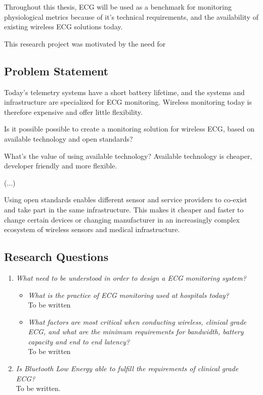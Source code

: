Throughout this thesis, ECG will be used as a benchmark for monitoring physiological metrics because of it's technical requirements, and the availability of existing wireless ECG solutions today.

This research project was motivated by the need for 

\subsection{Problem Statement} 

\label{sub:problem_statement}

Today's telemetry systems have a short battery lifetime, and the systems and infrastructure are specialized for ECG monitoring. Wireless monitoring today is therefore expensive and offer little flexibility. 

Is it possible possible to create a monitoring solution for wireless ECG, based on available technology and open standards? 

What's the value of using available technology? Available technology is cheaper, developer friendly and more flexible.

(...)

Using open standards enables different sensor and service providers to co-exist and take part in the same infrastructure. This makes it cheaper and faster to change certain devices or changing manufacturer in an increasingly complex ecosystem of wireless sensors and medical infrastructure.

\subsection{Research Questions} 

\label{ssub:research_questions} 
\begin{enumerate}
	
	\item \textit{What need to be understood in order to design a ECG monitoring system?} 
	\begin{itemize}
		
		\item \textit{What is the practice of ECG monitoring used at hospitals today?}\\To be written
		
		\item \textit{What factors are most critical when conducting wireless, clinical grade ECG, and what are the minimum requirements for bandwidth, battery capacity and end to end latency?}\\To be written 
	\end{itemize}
	
	\item \textit{Is Bluetooth Low Energy able to fulfill the requirements of clinical grade ECG?}\\To be written. 
\end{enumerate}

